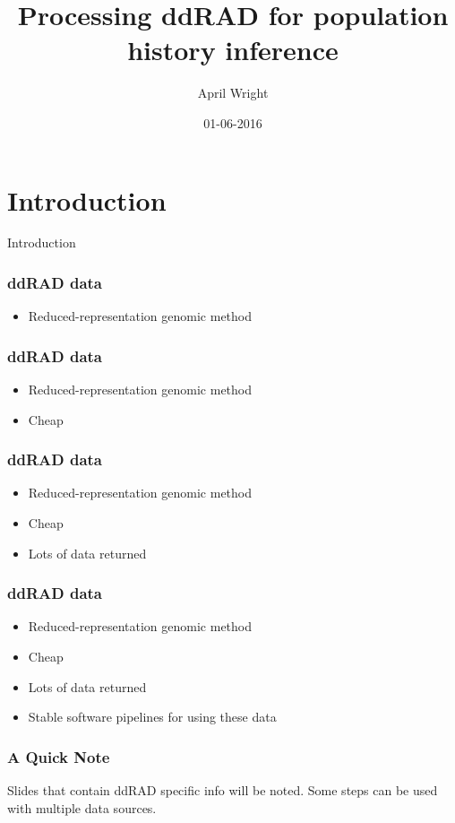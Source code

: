 \documentclass{beamer}
\title[ISU-01-06]{Processing ddRAD for population history inference}
\author{April Wright}
\institute{ISU and KU}
\date{01-06-2016}
\begin{document}
\begin{frame}
  \titlepage
\end{frame}


\section{Introduction}

\begin{frame}{Introduction}

\frametitle{ddRAD data}
\begin{itemize}
\item Reduced-representation genomic method
\end{itemize}
\end{frame}

\begin{frame}
\frametitle{ddRAD data}
\begin{itemize}
\item Reduced-representation genomic method
\item Cheap
\end{itemize}
\end{frame}

\begin{frame}
\frametitle{ddRAD data}
\begin{itemize}
\item Reduced-representation genomic method
\item Cheap
\item Lots of data returned
\end{itemize}
\end{frame}

\begin{frame}
\frametitle{ddRAD data}
\begin{itemize}
\item Reduced-representation genomic method
\item Cheap
\item Lots of data returned
\item Stable software pipelines for using these data
\end{itemize}
\end{frame}

\begin{frame}
\frametitle{A Quick Note}
Slides that contain ddRAD specific info will be noted. Some steps can be used with multiple data sources.
\end{frame}
\end{document}
